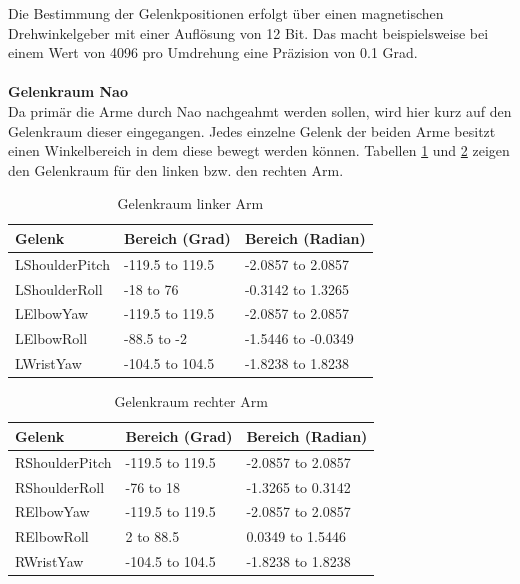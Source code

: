 Die Bestimmung der Gelenkpositionen erfolgt über einen magnetischen Drehwinkelgeber	mit einer Auflösung von 12 Bit. Das macht beispielsweise bei einem Wert von 4096 pro Umdrehung eine Präzision von 0.1 Grad.
\\
\\
\textbf{Gelenkraum Nao}
\\
Da primär die Arme durch Nao nachgeahmt werden sollen, wird hier kurz auf den Gelenkraum dieser eingegangen. Jedes einzelne Gelenk der beiden Arme besitzt einen Winkelbereich in dem diese bewegt werden können. Tabellen \ref{tab:Lgelenkraum} und \ref{tab:Rgelenkraum} zeigen den Gelenkraum für den linken bzw. den rechten Arm.

\begin{table}[H]
    \begin{tabular}{|l|l|l|}
    \hline
    \textbf{Gelenk}         & \textbf{Bereich (Grad) } & \textbf{Bereich (Radian)}   \\
    \hline
    LShoulderPitch & -119.5 to 119.5 & -2.0857 to 2.0857  \\
    LShoulderRoll  & -18 to 76       & -0.3142 to 1.3265  \\
    LElbowYaw      & -119.5 to 119.5 & -2.0857 to 2.0857  \\
    LElbowRoll     & -88.5 to -2     & -1.5446 to -0.0349 \\
    LWristYaw      & -104.5 to 104.5 & -1.8238 to 1.8238  \\ \hline
    \end{tabular}
    \caption {Gelenkraum linker Arm}
    \label{tab:Lgelenkraum}
\end{table}
\begin{table}[H]
    \begin{tabular}{|l|l|l|}
    \hline
    \textbf{Gelenk}         & \textbf{Bereich (Grad) } & \textbf{Bereich (Radian)}   \\
    \hline
    RShoulderPitch & -119.5 to 119.5 & -2.0857 to 2.0857 \\
    RShoulderRoll  & -76 to 18       & -1.3265 to 0.3142 \\
    RElbowYaw      & -119.5 to 119.5 & -2.0857 to 2.0857 \\
    RElbowRoll     & 2 to 88.5       & 0.0349 to 1.5446  \\
    RWristYaw      & -104.5 to 104.5 & -1.8238 to 1.8238 \\ \hline
    \end{tabular}
    \caption {Gelenkraum rechter Arm}
    \label{tab:Rgelenkraum}
\end{table}
